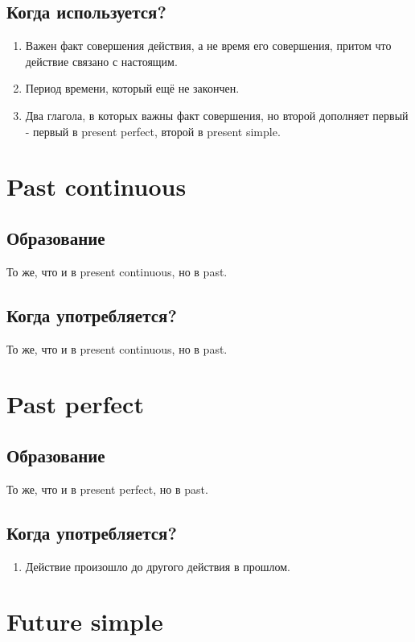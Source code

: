 \documentclass[oneside]{book}
\begin{document}
    \subsection{Когда используется?}
    \begin{enumerate}
        \item Важен факт совершения действия,
        а не время его совершения, притом что действие связано с настоящим.

        \item Период времени, который ещё не закончен.

        \item Два глагола, в которых важны факт совершения, но второй дополняет первый -
        первый в present perfect, второй в present simple.
    \end{enumerate}

    \section{Past continuous}
    \subsection{Образование}
    То же, что и в present continuous, но в past.
    \subsection{Когда употребляется?}
    То же, что и в present continuous, но в past.

    \section{Past perfect}
    \subsection{Образование}
    То же, что и в present perfect, но в past.

    \subsection{Когда употребляется?}
    \begin{enumerate}
        \item Действие произошло до другого действия в прошлом.
    \end{enumerate}

    \section{Future simple}
\end{document}
